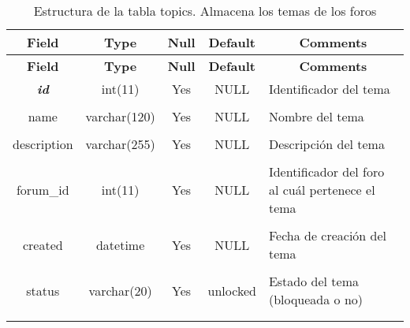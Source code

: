 %
%
\begin{longtable}{c c c c l}
	\multicolumn{1}{c}{\textbf{Field}} &
	\multicolumn{1}{c}{\textbf{Type}} &
	\multicolumn{1}{c}{\textbf{Null}} &
	\multicolumn{1}{c}{\textbf{Default}} &
	\multicolumn{1}{c}{\textbf{Comments}} \\ \hline \hline
\endfirsthead
	\multicolumn{1}{c}{\textbf{Field}} &
	\multicolumn{1}{c}{\textbf{Type}} &
	\multicolumn{1}{c}{\textbf{Null}} &
	\multicolumn{1}{c}{\textbf{Default}} &
	\multicolumn{1}{c}{\textbf{Comments}} \\ \hline \hline
\endhead \endfoot
	\textbf{\textit{id}} & int(11) & Yes & NULL & \parbox[t]{0.35\textwidth}{Identificador del tema} \\ \\  \hline
	name & varchar(120) & Yes & NULL & \parbox[t]{0.35\textwidth}{Nombre del tema} \\ \\  \hline
	description & varchar(255) & Yes & NULL & \parbox[t]{0.35\textwidth}{Descripción del tema} \\ \\  \hline
	forum\_id & int(11) & Yes & NULL & \parbox[t]{0.35\textwidth}{Identificador del foro al cuál pertenece el tema} \\ \\  \hline
	created & datetime & Yes & NULL & \parbox[t]{0.35\textwidth}{Fecha de creación del tema} \\ \\  \hline
	status & varchar(20) & Yes & unlocked & \parbox[t]{0.35\textwidth}{Estado del tema (bloqueada o no)} \\ \\ 
\caption[Estructura de la tabla topics]{Estructura de la tabla topics. Almacena los temas de los foros} \label{tab:forum_topics-structure} \\
\end{longtable}

